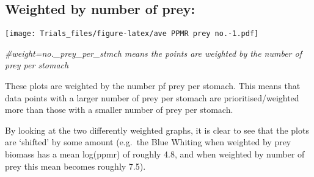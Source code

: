 \documentclass[
]{article}
\newenvironment{Shaded}{\begin{snugshade}}{\end{snugshade}}
\newcommand{\AttributeTok}[1]{\textcolor[rgb]{0.77,0.63,0.00}{#1}}
\newcommand{\CommentTok}[1]{\textcolor[rgb]{0.56,0.35,0.01}{\textit{#1}}}
\newcommand{\DecValTok}[1]{\textcolor[rgb]{0.00,0.00,0.81}{#1}}
\newcommand{\FunctionTok}[1]{\textcolor[rgb]{0.00,0.00,0.00}{#1}}
\newcommand{\NormalTok}[1]{#1}
\newcommand{\SpecialCharTok}[1]{\textcolor[rgb]{0.00,0.00,0.00}{#1}}
\newcommand{\StringTok}[1]{\textcolor[rgb]{0.31,0.60,0.02}{#1}}
\begin{document}
\hypertarget{weighted-by-number-of-prey}{%
\subsection{Weighted by number of
prey:}\label{weighted-by-number-of-prey}}

\begin{Shaded}
\end{Shaded}

\texttt{[image: Trials\_files/figure-latex/ave PPMR prey no.-1.pdf]}

\begin{Shaded}
\begin{Highlighting}[]
\CommentTok{\#weight=no.\_prey\_per\_stmch means the points are \textquotesingle{}weighted\textquotesingle{} by the number of prey per stomach}
\end{Highlighting}
\end{Shaded}

These plots are weighted by the number pf prey per stomach. This means
that data points with a larger number of prey per stomach are
prioritised/weighted more than those with a smaller number of prey per
stomach.

By looking at the two differently weighted graphs, it is clear to see
that the plots are `shifted' by some amount (e.g.~the Blue Whiting when
weighted by prey biomass has a mean log(ppmr) of roughly 4.8, and when
weighted by number of prey this mean becomes roughly 7.5).
\end{document}
